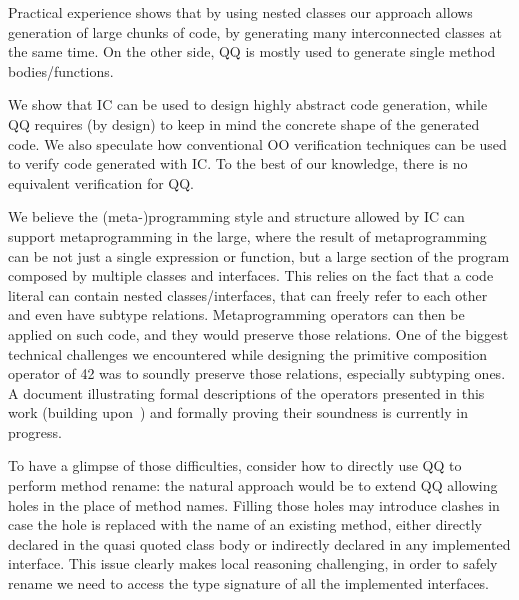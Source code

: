 Practical experience shows that by using nested classes our approach allows generation of large chunks of code,
by generating many interconnected classes at the same time. On the other side, QQ is mostly used to generate single method bodies/functions.

We show that IC can be used to design highly abstract code generation, 
while QQ requires (by design) to keep in mind the concrete shape of the generated code.
We also speculate how conventional OO verification techniques can be
used to verify code generated with IC. To the best of our knowledge, there is no
equivalent verification for QQ.

We believe the (meta-)programming style and structure allowed by IC
can support metaprogramming in the large, where the result of metaprogramming can be not just
a single expression or function, but a large section of the program composed by multiple
classes and interfaces. This relies on the fact that a code literal can contain nested classes/interfaces,
that can freely refer to each other and even have subtype relations.
Metaprogramming operators
can then be applied on such code, 
and they would preserve those relations.
One of the biggest technical challenges we encountered while designing the primitive composition operator of 42 was to soundly preserve those relations, especially subtyping ones.
A document illustrating formal descriptions of the operators presented in this work (building upon~\cite{servetto2014meta}) and formally proving 
their soundness is currently in progress.

To have a glimpse of those difficulties, consider how to directly use QQ to perform method rename:
the natural approach would be to extend QQ allowing
 holes in the place of method names.
Filling those holes may introduce clashes in case
the hole is replaced with the name of an existing method,
either directly declared in the quasi quoted class body or indirectly declared in any implemented interface.
This issue clearly makes local reasoning challenging, in order to safely
rename we need to access the type signature of all the implemented interfaces.


